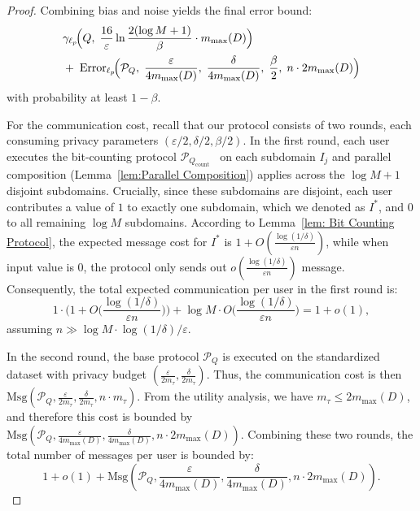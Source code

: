 \begin{proof}
Combining bias and noise yields the final error bound:
    \[
    \begin{aligned}
    &\mathrm{\gamma}_{\ell_p}\!\Big(
        Q,\;
        \frac{16}{\varepsilon}\ln\frac{2(\log M +1)}{\beta} \cdot m_{\max}(D)
    \Big)
    \\
    &+\;
    \mathrm{Error}_{\ell_p}\!\Big(
        \mathcal{P}_Q,\;
        \frac{\varepsilon}{4m_{\max}(D)},\;
        \frac{\delta}{4m_{\max}(D)},\;
        \frac{\beta}{2},\;
        n\cdot 2m_{\max}(D)
    \Big)
    \end{aligned}
    \]
    with probability at least $1-\beta$.

    For the communication cost, recall that our protocol consists of two rounds, each consuming privacy parameters $(\varepsilon/2,\delta/2,\beta/2)$. 
    In the first round, each user executes the bit-counting protocol \(\mathcal{P}_{Q_\text{count}}\)~\cite{ghazi2021differentially} on each subdomain $I_j$ and parallel composition (Lemma~\ref{lem:Parallel Composition}) applies across the \(\log M+1\) disjoint subdomains.
    Crucially, since these subdomains are disjoint, each user contributes a value of $1$ to exactly one subdomain, which we denoted as $I^*$,  and $0$ to all remaining $\log M$ subdomains.
    According to Lemma~\ref{lem: Bit Counting Protocol}, the expected message cost for $I^*$ is $1 + O(\frac{\log(1/\delta)}{\varepsilon n})$, while when input value is $0$, the protocol only sends out $o(\frac{\log(1/\delta)}{\varepsilon n})$ message.
    Consequently, the total expected communication per user in the first round is:
    \[
        1 \cdot \Big(1 + O\big(\frac{\log(1/\delta)}{\varepsilon n}\big)\Big) + \log M \cdot O\big(\frac{\log(1/\delta)}{\varepsilon n}\big) = 1 + o(1),
    \]
    assuming $n \gg \log M \cdot \log(1/\delta)/\varepsilon$.
    
    In the second round, the base protocol \(\mathcal{P}_Q\) is executed on the standardized dataset with privacy budget $(\frac{\varepsilon}{2m_\tau},\frac{\delta}{2m_\tau})$. Thus, the communication cost is then $\mathrm{Msg}(\mathcal{P}_Q,\frac{\varepsilon}{2m_\tau},\frac{\delta}{2m_\tau},n\cdot m_\tau)$. From the utility analysis, we have \(m_\tau \le 2 m_{\max}(D)\), 
    and therefore this cost is bounded by $\mathrm{Msg}(\mathcal{P}_Q,\frac{\varepsilon}{4 m_{\max}(D)},\frac{\delta}{4 m_{\max}(D)},n \cdot 2m_{\max}(D))$. Combining these two rounds, the total number of messages per user is bounded by:
    $$1+o(1)+ \mathrm{Msg}(\mathcal{P}_Q, \allowbreak \frac{\varepsilon}{4m_{\max}(D)}, \allowbreak \frac{\delta}{4m_{\max}(D)}, n\cdot 2m_{\max}(D)).$$


\end{proof}

